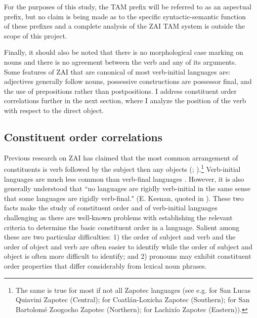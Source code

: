 For the purposes of this study, the TAM prefix will be referred to as an aspectual prefix, but no claim is being made as to the specific syntactic-semantic function of these prefixes and a complete analysis of the ZAI TAM system is outside the scope of this project.

Finally, it should also be noted that there is no morphological case marking on nouns and there is no agreement between the verb and any of its arguments. Some features of ZAI that are canonical of most verb-initial languages are: adjectives generally follow nouns, possessive constructions are possessor final, and the use of prepositions rather than postpositions. I address constituent order correlations further in the next section, where I analyze the position of the verb with respect to the direct object.



\subsection{Constituent order correlations}\label{odercorrelationssection}

Previous research on ZAI has claimed that the most common arrangement of constituents is verb followed by the subject then any objects (\citealt{pickett1960}; \citealt{pickett1998}).\footnote{The same is true for most if not all Zapotec languages (see e.g. \citet{lee2000} for San Lucas Quiavini Zapotec (Central); \citet{beamdeazcona2004} for Coatl\'{a}n-Loxicha Zapotec (Southern); \citet{sonnenschein2005} for San Bartolom\'{e} Zoogocho Zapotec (Northern); \citet{sicoli2007} for Lachix\'{i}o Zapotec (Eastern)).} Verb-initial languages are much less common than verb-final languages \citep{payne1995}. However, it is also generally understood that ``no languages are rigidly verb-initial in the same sense that some languages are rigidly verb-final." (E. Keenan, quoted in \citet[455]{payne1995}). These two facts make the study of constituent order and of verb-initial languages challenging as there are well-known problems with establishing the relevant criteria to determine the basic constituent order in a language. Salient among these are two particular difficulties: 1) the order of subject and verb and the order of object and verb are often easier to identify while the order of subject and object is often more difficult to identify; and 2) pronouns may exhibit constituent order properties that differ considerably from lexical noun phrases.

